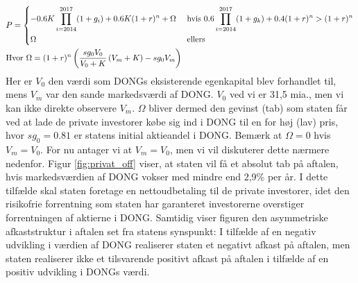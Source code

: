 \documentclass{article}
\begin{document}
\begin{align}
&P= 
\begin{dcases} 
-0.6K \prod_{i=2014}^{2017} (1+g_i)+0.6K(1+r)^n +\Omega&\text{     hvis    } 0.6\prod_{i=2014}^{2017}(1+g_k)+0.4(1+r)^n>(1+r)^n \\ 
\Omega  &\text{   ellers }
\end {dcases} \\
&\text{Hvor } \Omega=(1+r)^n\left( \frac{sg_0 V_0}{V_0+K} \left( V_m+K \right)-sg_0 V_m \right)
\label{eq:Goldman_deal}
\end{align}
Her er $V_0$ den værdi som DONGs eksisterende egenkapital blev forhandlet til, mens $V_m$ var den sande markedsværdi af DONG. $V_0$ ved vi er 31,5 mia., men vi kan ikke direkte observere $V_m$. $\Omega$ bliver dermed den gevinst (tab) som staten får ved at lade de private investorer købe sig ind i DONG til en for høj (lav) pris, hvor $sg_0=0.81$ er statens initial aktieandel i DONG. Bemærk at $\Omega=0$ hvis $V_m=V_0$. For nu antager vi at $V_m=V_0$, men vi vil diskuterer dette nærmere nedenfor. Figur \ref{fig:privat_off} viser, at staten vil få et absolut tab på aftalen, hvis markedsværdien af DONG vokser med mindre end 2,9\% per år. I dette tilfælde skal staten foretage en nettoudbetaling til de private investorer, idet den risikofrie forrentning som staten har garanteret investorerne overstiger forrentningen af aktierne i DONG. Samtidig viser figuren den asymmetriske afkaststruktur i aftalen set fra statens synspunkt: I tilfælde af en negativ udvikling i værdien af DONG realiserer staten et negativt afkast på aftalen, men staten realiserer ikke et tilsvarende positivt afkast på aftalen i tilfælde af en positiv udvikling i DONGs værdi. 
\end{document}
